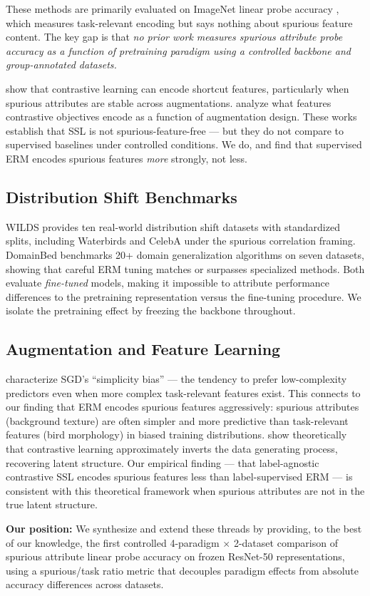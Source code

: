 These methods are primarily evaluated on ImageNet linear probe accuracy \citep{Chen2020SimCLR, Caron2021DINO}, which measures task-relevant encoding but says nothing about spurious feature content. The key gap is that \textit{no prior work measures spurious attribute probe accuracy as a function of pretraining paradigm using a controlled backbone and group-annotated datasets.}

\citet{Robinson2021Contrastive} show that contrastive learning can encode shortcut features, particularly when spurious attributes are stable across augmentations. \citet{Wen2021Feature} analyze what features contrastive objectives encode as a function of augmentation design. These works establish that SSL is not spurious-feature-free --- but they do not compare to supervised baselines under controlled conditions. We do, and find that supervised ERM encodes spurious features \textit{more} strongly, not less.

\subsection{Distribution Shift Benchmarks}

WILDS \citep{Koh2021WILDS} provides ten real-world distribution shift datasets with standardized splits, including Waterbirds and CelebA under the spurious correlation framing. DomainBed \citep{Gulrajani2021DomainBed} benchmarks 20+ domain generalization algorithms on seven datasets, showing that careful ERM tuning matches or surpasses specialized methods. Both evaluate \textit{fine-tuned} models, making it impossible to attribute performance differences to the pretraining representation versus the fine-tuning procedure. We isolate the pretraining effect by freezing the backbone throughout.

\subsection{Augmentation and Feature Learning}

\citet{Shah2020Simplicity} characterize SGD's ``simplicity bias'' --- the tendency to prefer low-complexity predictors even when more complex task-relevant features exist. This connects to our finding that ERM encodes spurious features aggressively: spurious attributes (background texture) are often simpler and more predictive than task-relevant features (bird morphology) in biased training distributions. \citet{Zimmermann2021Contrastive} show theoretically that contrastive learning approximately inverts the data generating process, recovering latent structure. Our empirical finding --- that label-agnostic contrastive SSL encodes spurious features less than label-supervised ERM --- is consistent with this theoretical framework when spurious attributes are not in the true latent structure.

\textbf{Our position:} We synthesize and extend these threads by providing, to the best of our knowledge, the first controlled 4-paradigm $\times$ 2-dataset comparison of spurious attribute linear probe accuracy on frozen ResNet-50 representations, using a spurious/task ratio metric that decouples paradigm effects from absolute accuracy differences across datasets.
